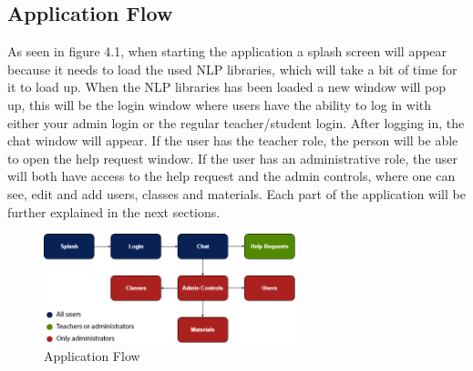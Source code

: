 \subsection{Application Flow}
As seen in figure 4.1, when starting the application a splash screen will appear because it needs to load the used NLP libraries, which will take a bit of time for it to load up. When the NLP libraries has been loaded a new window will pop up, this will be the login window where users have the ability to log in with either your admin login or the regular teacher/student login. After logging in, the chat window will appear. 
If the user has the teacher role, the person will be able to open the help request window. If the user has an administrative role, the user will both have access to the help request and the admin controls, where one can see, edit and add users, classes and materials.
\newline\newline
Each part of the application will be further explained in the next sections.

\begin{figure}[H]
    \centering
    \includegraphics[width=0.65\textwidth]{figures/Flow.png}
    \caption{Application Flow}
    \label{fig:flow_chart}
\end{figure}
